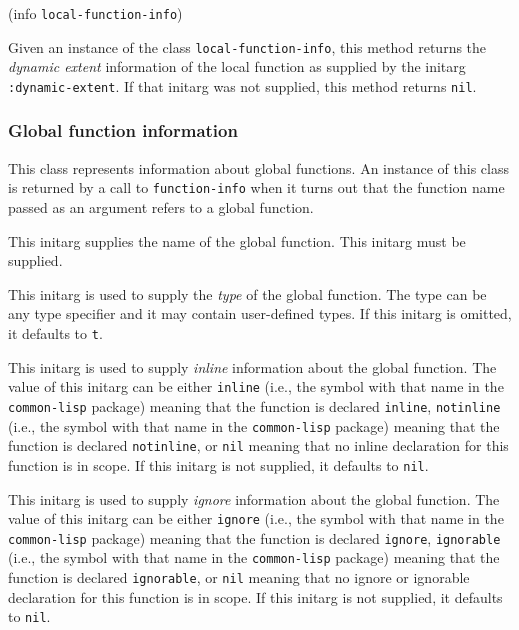  {(info {\tt local-function-info})}

Given an instance of the class \texttt{local-function-info}, this
method returns the \emph{dynamic extent} information of the local
function as supplied by the initarg \texttt{:dynamic-extent}.  If that
initarg was not supplied, this method returns \texttt{nil}.

\subsubsection{Global function information}


This class represents information about global functions.  An instance
of this class is returned by a call to \texttt{function-info} when it
turns out that the function name passed as an argument refers to a
global function.


This initarg supplies the name of the global function.  This initarg
must be supplied.


This initarg is used to supply the \emph{type} of the global function.
The type can be any type specifier and it may contain user-defined
types.  If this initarg is omitted, it defaults to \texttt{t}.


This initarg is used to supply \emph{inline} information about the
global function.  The value of this initarg can be either
\texttt{inline} (i.e., the symbol with that name in the
\texttt{common-lisp} package) meaning that the function is declared
\texttt{inline}, \texttt{notinline} (i.e., the symbol with that name
in the \texttt{common-lisp} package) meaning that the function is
declared \texttt{notinline}, or \texttt{nil} meaning that no inline
declaration for this function is in scope.  If this initarg is not
supplied, it defaults to \texttt{nil}.


This initarg is used to supply \emph{ignore} information about the
global function.  The value of this initarg can be either
\texttt{ignore} (i.e., the symbol with that name in the
\texttt{common-lisp} package) meaning that the function is declared
\texttt{ignore}, \texttt{ignorable} (i.e., the symbol with that name
in the \texttt{common-lisp} package) meaning that the function is
declared \texttt{ignorable}, or \texttt{nil} meaning that no ignore or
ignorable declaration for this function is in scope.  If this initarg
is not supplied, it defaults to \texttt{nil}.

